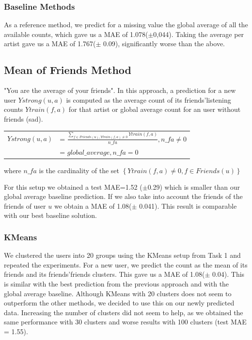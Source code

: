 \subsubsection{Baseline Methods}
As a reference method, we predict for a missing value the global average of all the available counts, which gave us a MAE of 1.078($\pm$0,044). Taking the average per artist gave us a MAE of 1.767($\pm$  0.09), significantly worse than the above.

\subsection{Mean of Friends Method}
 "You are the average of your friends". In this approach, a prediction for a new user $Ystrong(u,a)$ is computed as the average count of its friends'listening counts $Ytrain(f,a)$ for that artist or global average count for an user without friends (sad).

\begin{table}[h]
  \centering
  \begin{tabular}{ c  l }
  $Ystrong(u,a) $&= $\frac{\sum_{f\in Friends(u), Ytrain(f,a)\neq0}{Ytrain(f,a)}}{n\_fa}, n\_fa \neq 0$ \\ 
                          &= $global\_average, n\_fa = 0$ \\ 
  \end{tabular}
\end{table}
where $n\_fa$ is the cardinality of the set $\left\{ Ytrain(f,a)\neq0, f\in Friends(u)\right\}$

For this setup  we obtained a test MAE=1.52 ($\pm$0.29) which is smaller than our global average baseline prediction.
If we also take into account the friends of the friends of user $u$ we obtain  a MAE of 1.08($\pm$ 0.041). This result is comparable with our best baseline solution.

\subsubsection{KMeans}
We clustered the users into 20 groups using the KMeans setup from Task 1
and repeated the experiments. For a new user,  we predict the count as the mean of its friends and its friends'friends clusters. This gave us a MAE of
1.08($\pm$ 0.04). This is similar with the best prediction from the previous approach and with the  global average baseline. Although KMeans with 20 clusters does not seem to outperform the other methods, we decided to use this on our newly predicted data.
Increasing the number of clusters did not seem to help, as we obtained the same performance with 30 clusters and worse results with 100 clusters (test MAE = 1.55). 
 

